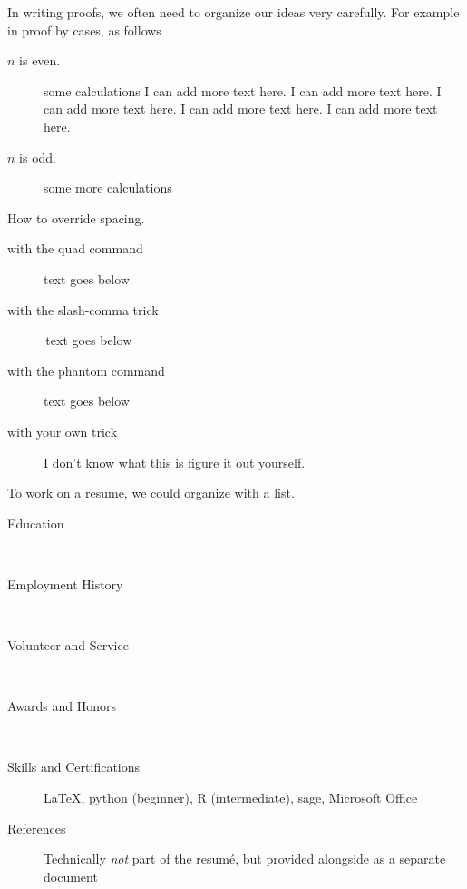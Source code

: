\documentclass[12pt]{article}
\begin{document}
\newpage

In writing proofs, we often need to organize our ideas very carefully.  For example in proof by cases, as follows
\begin{description}
\item[\(n\) is even.]\quad\newline
some calc\quad ulat\qquad ions\newline
I can add more text here. I can add more text here. I can add more text here.  I can add more text here. I can add more text here.
\item[\(n\) is odd.] some more calculations
\end{description}

How to override spacing.
\begin{description}
\item[with the quad command]\quad\newline text goes below
\item[with the slash-comma trick]\,\newline text goes below
\item[with the phantom command]\phantom{}\newline text goes below
\item[with your own trick] I don't know what this is figure it out yourself.
\end{description}

\newpage
To work on a resume, we could organize with a list.
\begin{description}
\item[Education]\,\newline
\item[Employment History]\,\newline
\item[Volunteer and Service]\,\newline
\item[Awards and Honors]\,\newline
\item[Skills and Certifications] {\LaTeX}, python (beginner), R (intermediate), sage, Microsoft Office
\item[References] Technically \emph{not} part of the resum\'{e}, but provided alongside as a separate document
\end{description}
\end{document}
